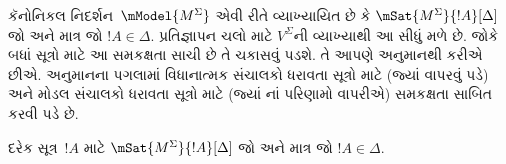 \begingroup
\makeatletter{}\makeatother


\label{guunit:OLP-0447}


કૅનોનિકલ નિદર્શન~$\mModel{M^\Sigma}$ એવી રીતે વ્યાખ્યાયિત છે કે
$\mSat{M^\Sigma}{!A}[\Delta]$ જો અને માત્ર જો $!A \in \Delta$.
પ્રતિજ્ઞાપન ચલો માટે $V^\Sigma$ની વ્યાખ્યાથી આ સીધું
મળે છે. જોકે બધાં સૂત્રો માટે આ સમકક્ષતા સાચી છે તે ચકાસવું
પડશે. તે આપણે અનુમાનથી કરીએ છીએ. અનુમાનના પગલામાં વિધાનાત્મક
સંચાલકો ધરાવતા સૂત્રો માટે (જ્યાં
 વાપરવું પડે) અને મોડલ સંચાલકો
ધરાવતા સૂત્રો માટે (જ્યાં નાં પરિણામો વાપરીએ)
સમકક્ષતા સાબિત કરવી પડે છે.

\begin{prop}[સત્યતા સહાયક પ્રમેય]
  દરેક સૂત્ર~$!A$ માટે $\mSat{M^\Sigma}{!A}[\Delta]$ જો અને
  માત્ર જો $!A \in \Delta$.
\end{prop}

